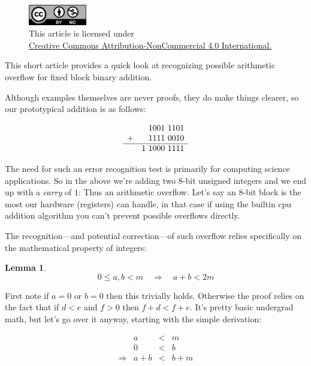 \documentclass[twoside]{article}
\newtheorem{lemma}{Lemma}[section]
\begin{document}
\begin{figure}[h]
\centering
\includegraphics[width=1in]{cc-by-nc.png}\\[0.1in]
\tiny This article is licensed under \\
\href{http://creativecommons.org/licenses/by-nc/4.0/}
{Creative Commons Attribution-NonCommercial 4.0 International.}\\[0.3in]
\end{figure}

This short article provides a quick look at recognizing possible arithmetic overflow for fixed block binary addition.

Although examples themselves are never proofs, they do make things clearer, so our prototypical addition is as follows:

$$ \begin{array}{rr}
   & 1001\ 1101 \\
 + & 1111\ 0010 \\\hline
   & 1\ 1000\ 1111
\end{array} $$

The need for such an error recognition test is primarily for computing science applications.
So in the above we're adding two 8-bit unsigned integers and we end up with a \emph{carry} of $ 1 $:
Thus an arithmetic overflow. Let's say an 8-bit block is the most our hardware (registers) can handle,
in that case if using the builtin cpu addition algorithm you can't prevent possible overflows directly.

The recognition---and potential correction---of such overflow relies specifically on the
mathematical property of integers:

\begin{lemma} $$ 0\leq a,b < m\quad\Longrightarrow\quad a+b < 2m $$
\end{lemma}

First note if $ a=0 $ or $ b=0 $ then this trivially holds. Otherwise the proof relies on the fact that
if $ d < e $ and $ f > 0 $ then $ f+d < f+e $. It's pretty basic undergrad math, but let's go over it anyway,
starting with the simple derivation:

$$ \begin{array}{lrcl}
 & a & < & m \\
 & 0 & < & b \\
\Longrightarrow & a+b & < & b+m
\end{array} $$
\end{document}
